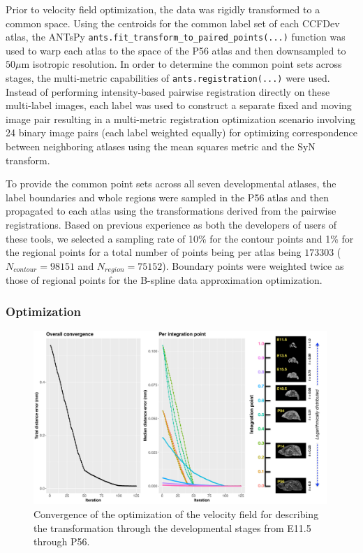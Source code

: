 \documentclass[
  12pt,
]{article}
\begin{document}
Prior to velocity field optimization, the data was rigidly transformed
to a common space. Using the centroids for the common label set of each
CCFDev atlas, the ANTsPy
\texttt{ants.fit\_transform\_to\_paired\_points(...)} function was used
to warp each atlas to the space of the P56 atlas and then downsampled to
\(50 \mu\)m isotropic resolution. In order to determine the common point
sets across stages, the multi-metric capabilities of
\texttt{ants.registration(...)} were used. Instead of performing
intensity-based pairwise registration directly on these multi-label
images, each label was used to construct a separate fixed and moving
image pair resulting in a multi-metric registration optimization
scenario involving 24 binary image pairs (each label weighted equally)
for optimizing correspondence between neighboring atlases using the mean
squares metric and the SyN transform.

To provide the common point sets across all seven developmental atlases,
the label boundaries and whole regions were sampled in the P56 atlas and
then propagated to each atlas using the transformations derived from the
pairwise registrations. Based on previous experience as both the
developers of users of these tools, we selected a sampling rate of 10\%
for the contour points and 1\% for the regional points for a total
number of points being per atlas being \(173303\)
(\(N_{contour} = 98151\) and \(N_{region}=75152\)). Boundary points were
weighted twice as those of regional points for the B-spline data
approximation optimization.

\hypertarget{optimization-1}{%
\subsubsection*{Optimization}\label{optimization-1}}

\begin{figure}[!htb]
\centering
\includegraphics[width=0.99\textwidth]{Figures/convergence.pdf}
\caption{Convergence of the optimization of the velocity field for describing the 
transformation through the developmental stages from E11.5 through P56.}
\label{fig:convergence}
\end{figure}
\end{document}
